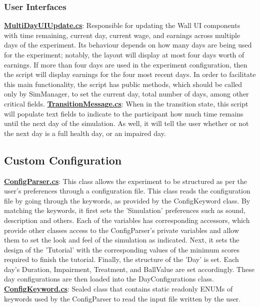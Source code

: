 \documentclass{article}
\begin{document}
\subsubsection{User Interfaces}
\href{https://bit.ly/2G9SRs1}{\textbf{MultiDayUIUpdate.cs}}: Responsible for updating the Wall UI components with time remaining, current day, current wage, and earnings across multiple days of the experiment. Its behaviour depends on how many days are being used for the experiment; notably, the layout will display at most four days worth of earnings. If more than four days are used in the experiment configuration, then the script will display earnings for the four most recent days. In order to facilitate this main functionality, the script has public methods, which should be called only by SimManager, to set the current day, total number of days, among other critical fields. \newline \newline
\href{https://bit.ly/2VHtW5B}{\textbf{TransitionMessage.cs}}: When in the transition state, this script will populate text fields to indicate to the participant how much time remains until the next day of the simulation. As well, it will tell the user whether or not the next day is a full health day, or an impaired day. \newline \newline


\subsection{Custom Configuration} %
\href{https://bit.ly/2TZaLYj}{\textbf{ConfigParser.cs}}: This class allows the experiment to be structured as per the user's preferences through a configuration file. This class reads the configuration file by going through the keywords, as provided by the ConfigKeyword class. By matching the keywords, it first sets the 'Simulation' preferences such as sound, description and others. Each of the variables has corresponding accessors, which provide other classes access to the ConfigParser's private variables and allow them to set the look and feel of the simulation as indicated. Next, it sets the design of the 'Tutorial' with the corresponding values of the minimum scores required to finish the tutorial. Finally, the structure of the 'Day' is set. Each day's Duration, Impairment, Treatment, and BallValue are set accordingly. These day configurations are then loaded into the DayConfigurations class.
\href{https://bit.ly/2TWgOwJ}{\textbf{ConfigKeyword.cs}}: Sealed class that contains static readonly ENUMs of keywords used by the ConfigParser to read the input file written by the user. 
\end{document}
